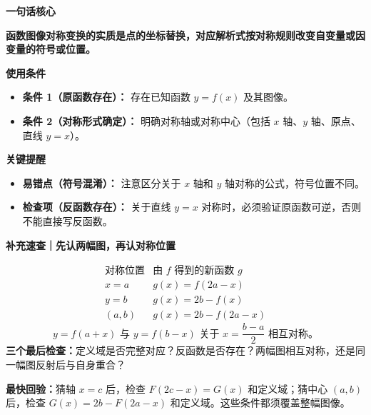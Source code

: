 \clearpage
\begin{summarybox}
	\textbf{\textcolor{CSummary}{一句话核心}}

	\textbf{函数图像对称变换的实质是点的坐标替换，对应解析式按对称规则改变自变量或因变量的符号或位置。}

	\medskip
	\textbf{\textcolor{CSummary}{使用条件}}
	\begin{itemize}[leftmargin=*, itemsep=0.5em, topsep=0.4em]
		\item \textbf{条件 1（原函数存在）：} 存在已知函数 $y=f(x)$ 及其图像。
		\item \textbf{条件 2（对称形式确定）：} 明确对称轴或对称中心（包括 $x$ 轴、$y$ 轴、原点、直线 $y=x$）。
	\end{itemize}

	\medskip
	\textbf{\textcolor{CSummary}{关键提醒}}
	\begin{itemize}[leftmargin=*, itemsep=0.5em, topsep=0.4em]
		\item \textbf{易错点（符号混淆）：} 注意区分关于 $x$ 轴和 $y$ 轴对称的公式，符号位置不同。
		\item \textbf{检查项（反函数存在）：} 关于直线 $y=x$ 对称时，必须验证原函数可逆，否则不能直接写反函数。
	\end{itemize}
\end{summarybox}
\clearpage
\begin{summarybox}
\textbf{补充速查｜先认两幅图，再认对称位置}

\[\begin{array}{c|c}
\text{对称位置}&\text{由 }f\text{ 得到的新函数 }g\\\hline
x=a & g(x)=f(2a-x)\\
y=b & g(x)=2b-f(x)\\
(a,b) & g(x)=2b-f(2a-x)
\end{array}\]
\[\boxed{y=f(a+x)\text{ 与 }y=f(b-x)\text{ 关于 }x=\frac{b-a}{2}\text{ 相互对称。}}\]
\textbf{三个最后检查：}定义域是否完整对应？反函数是否存在？两幅图相互对称，还是同一幅图反射后与自身重合？

\textbf{最快回验：}猜轴 $x=c$ 后，检查 $F(2c-x)=G(x)$ 和定义域；猜中心 $(a,b)$ 后，检查 $G(x)=2b-F(2a-x)$ 和定义域。这些条件都须覆盖整幅图像。

\end{summarybox}


